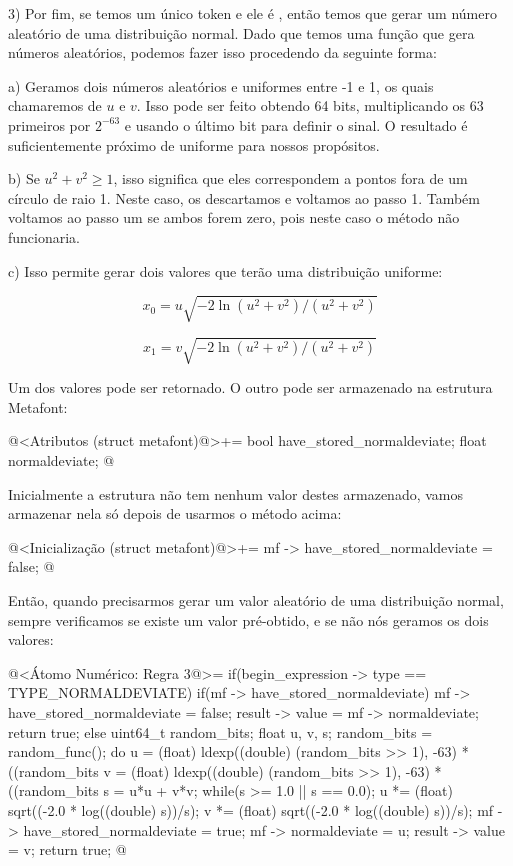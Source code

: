 3) Por fim, se temos um único token e ele é ,
então temos que gerar um número aleatório de uma distribuição
normal. Dado que temos uma função que gera números aleatórios, podemos
fazer isso procedendo da seguinte forma:

a) Geramos dois números aleatórios e uniformes entre -1 e 1, os quais
chamaremos de $u$ e $v$. Isso pode ser feito obtendo 64 bits,
multiplicando os 63 primeiros por $2^{-63}$ e usando o último bit para
definir o sinal. O resultado é suficientemente próximo de uniforme
para nossos propósitos.

b) Se $u^2+v^2 \geq 1$, isso significa que eles correspondem a pontos
fora de um círculo de raio 1. Neste caso, os descartamos e voltamos ao
passo 1. Também voltamos ao passo um se ambos forem zero, pois neste
caso o método não funcionaria.

c) Isso permite gerar dois valores que terão uma distribuição
uniforme:

$$
x_0 = u\sqrt{-2\ln(u^2+v^2)/(u^2+v^2)}
$$

$$
x_1 = v\sqrt{-2\ln(u^2+v^2)/(u^2+v^2)}
$$

Um dos valores pode ser retornado. O outro pode ser armazenado na
estrutura Metafont:

\iniciocodigo
@<Atributos (struct metafont)@>+=
  bool have_stored_normaldeviate;
  float normaldeviate;
@
\fimcodigo

Inicialmente a estrutura não tem nenhum valor destes armazenado, vamos
armazenar nela só depois de usarmos o método acima:

\iniciocodigo
@<Inicialização (struct metafont)@>+=
mf -> have_stored_normaldeviate = false;
@
\fimcodigo

Então, quando precisarmos gerar um valor aleatório de uma distribuição
normal, sempre verificamos se existe um valor pré-obtido, e se não nós
geramos os dois valores:

\iniciocodigo
@<Átomo Numérico: Regra 3@>=
if(begin_expression -> type == TYPE_NORMALDEVIATE){
  if(mf -> have_stored_normaldeviate){
    mf -> have_stored_normaldeviate = false;
    result -> value = mf -> normaldeviate;
    return true;
  }
  else{
    uint64_t random_bits;
    float u, v, s;
    random_bits = random_func();
    do{
      u = (float) ldexp((double) (random_bits >> 1), -63) *
            ((random_bits %
      v = (float) ldexp((double) (random_bits >> 1), -63) *
            ((random_bits %
      s = u*u + v*v;
    } while(s >= 1.0 || s == 0.0);
    u *= (float) sqrt((-2.0 * log((double) s))/s);
    v *= (float) sqrt((-2.0 * log((double) s))/s);
    mf -> have_stored_normaldeviate = true;
    mf -> normaldeviate = u;
    result -> value = v;
    return true;
  }
}
@
\fimcodigo

